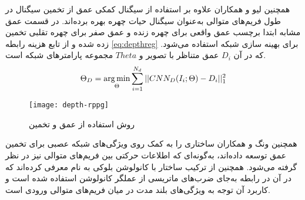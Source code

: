    همچنین لیو و همکاران
\cite{liu2018learning}
   علاوه بر استفاده از سیگنال کمکی عمق از تخمین سیگنال  در طول فریم‌های متوالی به‌عنوان سیگنال حیات چهره بهره برده‌اند. در قسمت عمق مشابه
\cite{atoum2017face}
   ابتدا برچسب عمق واقعی برای چهره زنده و عمق صفر برای چهره تقلبی تخمین زده شده و از تابع هزینه رابطه
\ref{eq:depthreg}
   برای بهینه سازی شبکه استفاده می‌شود. که در آن 
$D_i$
 عمق متناظر با تصویر و 
$Theta$
مجموعه پارامتر‌های شبکه است.
\begin{equation}\label{eq:depthreg}
	\Theta_D = \operatorname*{arg\,min}_\Theta{\sum_{i=1}^{N_d}||CNN_D(I_i;\Theta)-D_i||^2_1} 
\end{equation}

\begin{figure}[t]
	\centerline{\texttt{[image: depth-rppg]}}
	\caption{روش استفاده از عمق و تخمین  \cite{liu2018learning}}
	\label{fig:depth-rppg}
\end{figure}

همچنین ونگ و همکاران
\cite{wang2018exploiting}
ساختاری را به کمک  روی ویژگی‌های شبکه عصبی برای تخمین عمق توسعه داده‌اند، به‌گونه‌ای که اطلاعات حرکتی بین فریم‌های متوالی نیز در نظر گرفته می‌شود. همچنین از ترکیب ساختار
  \cite{cho2014learning}
با کانولوشن بلوکی به نام  معرفی کرده‌اند که در آن در رابطه  به‌جای ضرب‌های ماتریسی از عملگر کانولوشن استفاده شده است و کاربرد آن توجه به ویژگی‌های بلند مدت در میان فریم‌های متوالی ورودی است.

